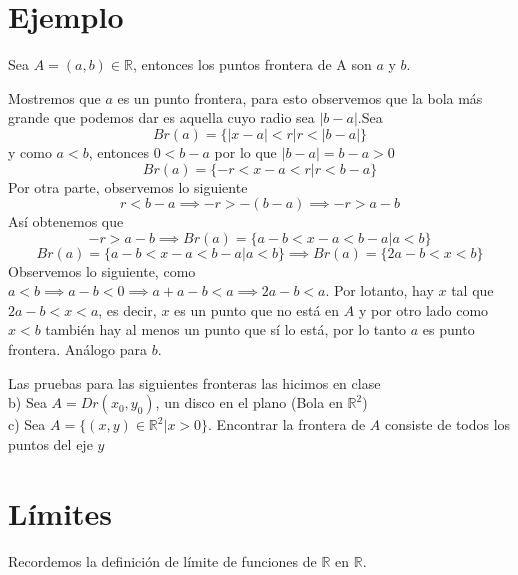 \documentclass[letterpaper]{article}
\providecommand{\abs}[1]{\lvert#1\rvert}
\newcommand{\R}{\mathds{R}}
\renewcommand{\*}{\cdot}
\theoremstyle{definition}
\begin{document}
\section*{Ejemplo}
Sea $ A = (a,b)  \in \R$, entonces los puntos frontera de A son $ a  $ y $ b $.

Mostremos que $ a $ es un punto frontera, para esto observemos que la bola más grande que podemos dar es aquella cuyo radio sea $ \abs{b -a} $.Sea 
\[ Br(a) = \{ \abs{x -a} < r | r < \abs{b-a} \} \] y como $ a<b $, entonces $ 0 < b -a $ por lo que $ \abs{b-a} = b-a >0 $
\[ Br(a)  = \{ -r < x-a < r | r < b-a \} \]
Por otra parte, observemos lo siguiente
\[ r < b-a \implies -r > -(b-a) \implies -r > a-b \]
Así obtenemos que
\[  -r > a-b \implies Br(a) = \{ a-b < x-a < b-a | a<b \} \]
\[ Br(a) = \{ a-b < x-a < b-a | a<b \} \implies Br(a) = \{ 2a-b < x < b \} \]Observemos lo siguiente, como $ a< b  \implies a-b < 0 \implies a +a -b < a  \implies 2a - b < a$. Por lotanto, hay $ x $ tal que $ 2a-b < x < a $, es decir, $ x $ es un punto que no está en $ A $ y por otro lado como $ x<b $ también hay al menos un punto que sí lo está, por lo tanto $ a $ es punto frontera. Análogo  para $ b $.

Las pruebas para las siguientes fronteras las hicimos en clase\\


b) Sea $ A  = Dr(x_0,y_0)$, un disco en el plano (Bola en $ \R^2 $)\\


c) Sea $ A = \{ (x,y) \in \R^2 | x > 0\} $. Encontrar la frontera de $ A $ consiste de todos los puntos del eje $ y $
\section{Límites}
Recordemos la definición de límite de funciones de $ \R $ en $ \R $.\\
\end{document}
